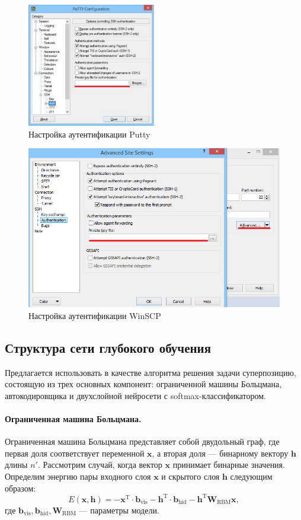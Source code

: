 \documentclass[12pt,notitlepage]{article}
\begin{document}
\begin{figure}[tbph!]
 \centering
  \includegraphics[width=0.5\textwidth]{putty.pdf}
 \caption{Настройка аутентификации Putty}
 \label{fig:putty}
\end{figure}
\begin{figure}[tbph!]
 \centering
  \includegraphics[width=\textwidth]{scp.png}
 \caption{Настройка аутентификации WinSCP}
 \label{fig:scp}
\end{figure}

\subsection{Структура сети глубокого обучения}
Предлагается использовать в качестве алгоритма решения задачи суперпозицию, состоящую из трех основных компонент:
ограниченной машины Больцмана, автокодировщика и двухслойной нейросети с softmax-классификатором.
\paragraph{Ограниченная машина Больцмана.}
Ограниченная машина Больцмана представляет собой двудольный граф, где первая доля соответствует переменной $\mathbf{x}$, а вторая доля --- бинарному вектору $\mathbf{h}$ длины $n'$. 
Рассмотрим случай, когда вектор $\mathbf{x}$ принимает бинарные значения. Определим энергию пары входного слоя $\mathbf{x}$ и скрытого слоя $\mathbf{h}$ следующим образом:
\[
 E(\mathbf{x},\mathbf{h}) = -\mathbf{x}^\text{T} \cdot \mathbf{b}_\text{vis} -\mathbf{h}^\text{T} \cdot \mathbf{b}_\text{hid} - \mathbf{h}^\text{T}\mathbf{W}_\text{RBM}\mathbf{x},
\]
где $\mathbf{b}_\text{vis}, \mathbf{b}_\text{hid}, \mathbf{W}_\text{RBM}$ --- параметры модели.
\end{document}
